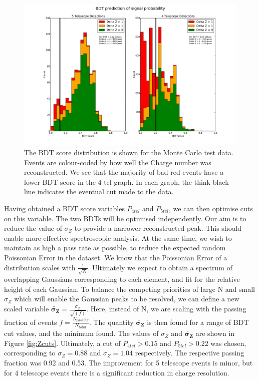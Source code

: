 \documentclass[11pt]{article}
\begin{document}
\begin{figure}
\begin{center}
\includegraphics[width=\textwidth]{Likelihood}
\caption{The BDT score distribution is shown for the Monte Carlo test data. Events are colour-coded by how well the Charge number was reconstructed. We see that the majority of bad red events have a lower BDT score in the 4-tel graph. In each graph, the think black line indicates the eventual cut made to the data.}
\label{fig:reconBDTdistribution}
\end{center}
\end{figure}

Having obtained a BDT score variables $P_{4tel}$ and $P_{5tel}$, we can then optimise cuts on this variable. The two BDTs will be optimised independently. Our aim is to reduce the value of $\sigma_{Z}$ to provide a narrower reconstructed peak. This should enable more effective spectroscopic analysis. At the same time, we wish to maintain as high a pass rate as possible, to reduce the expected random Poissonian Error in the dataset. We know that the Poissonian Error of a distribution scales with $\frac{1}{\sqrt{N}}$. Ultimately we expect to obtain a spectrum of overlapping Gaussians corresponding to each element, and fit for the relative height of each Gaussian. To balance the competing priorities of large N and small $\sigma_{Z}$ which will enable the Gaussian peaks to be resolved, we can define a new scaled variable $\mathbf{\tilde{\sigma_{Z}}} = \frac{\sigma_{Z}}{\sqrt{(f)}}$. Here, instead of N, we are scaling with the passing fraction of events $f = \frac{N_{passing}}{N_{total}}$. The quantity $\mathbf{\tilde{\sigma_{Z}}}$ is then found for a range of BDT cut values, and the minimum found. The values of $\sigma_{Z}$ and $\mathbf{\tilde{\sigma_{Z}}}$ are shown in Figure \ref{fig:Zcuts}. Ultimately, a cut of $P_{4tel} > 0.15$ and $P_{5tel} > 0.22$ was chosen, corresponding to $\sigma_{Z}=0.88$ and $\sigma_{Z}=1.04$ respectively. The respective passing fraction was 0.92 and 0.53. The improvement for 5 telescope events is minor, but for 4 telescope events there is a significant reduction in charge resolution.
\end{document}
